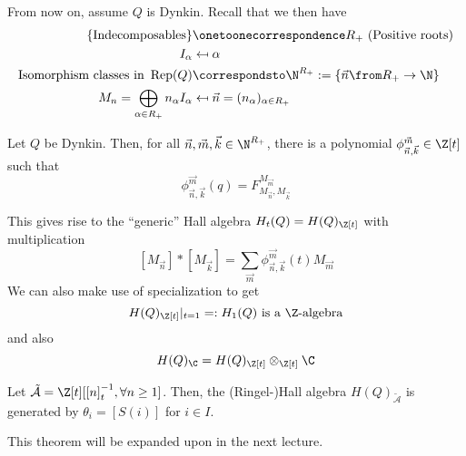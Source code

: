 \documentclass[11pt,leqno,oneside]{amsbook}
\numberwithin{thm}{section}
\newcommand{\Rep}{\operatorname{Rep}} %
\renewcommand{\Q}{Q} %
\newcommand\mapsfrom{\mathrel{\reflectbox{\ensuremath{\mapsto}}}}
\renewcommand{\roots}{R} %
\newcommand{\A}{\tilde{\mathcal{A}}}
\begin{document}
From now on, assume \(\Q\) is Dynkin. Recall that we then have
\begin{align*}
  \{\text{Indecomposables}\} & \onetoonecorrespondence \roots_+ \text{
                               (Positive roots)} \\
  I_\alpha & \mapsfrom \alpha \\
  \text{Isomorphism classes in } \Rep(\Q) & \correspondsto \N^{\roots_+} :=
                                            \{\vec{n} \from \roots_+ \to
                                            \N\} \\
  M_n = \bigoplus_{\alpha \in \roots_+} n_\alpha I_\alpha
  & \mapsfrom \vec{n} = (n_\alpha)_{\alpha \in \roots_+}
\end{align*}
\begin{prop}
  Let \(\Q\) be Dynkin. Then, for all \(\vec{n}, \vec{m}, \vec{k} \in
  \N^{\roots_+}\), there is a polynomial \(\phi_{\vec{n},\vec{k}}^{\vec{m}}
  \in \Z[t]\) such that \[
    \phi_{\vec{n},\vec{k}}^{\vec{m}}(q) = F_{M_{\vec{n}}, M_{\vec{k}}}^{M_{\vec{m}}}
  \]
\end{prop}
This gives rise to the ``generic'' Hall algebra \(H_t(\Q) =
H(\Q)_{\Z[t]}\) with multiplication \[
  [M_{\vec{n}}] * [M_{\vec{k}}] = \sum_{\vec{m}}
  \phi_{\vec{n},\vec{k}}^{\vec{m}}(t) M_{\vec{m}}
\]
We can also make use of specialization to get \[
  H(\Q)_{\Z[t]}|_{t=1} =: H_1(\Q) \text{ is a }\Z\text{-algebra}
\]
and also \[
  H(\Q)_\C = H(\Q)_{\Z[t]} \otimes_{\Z[t]} \C
\]
\begin{thm}\label{hall-alg-gen-by-thetas}
  Let \(\A = \Z[t][[n]_t^{-1}, \forall n \geq 1]\). Then, the
  (Ringel-)Hall algebra \(H(\Q)_{\A}\) is generated by \(\theta_i =
  [S(i)]\) for \(i \in I\). 
\end{thm}
This theorem will be expanded upon in the next lecture.
\end{document}
